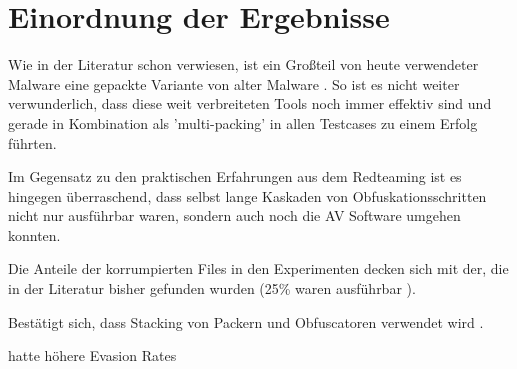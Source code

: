 \section{Einordnung der Ergebnisse}
Wie in der Literatur schon verwiesen, ist ein Großteil von heute verwendeter Malware eine gepackte Variante von alter Malware \cite{zhang_2019_a}. So ist es nicht weiter verwunderlich, dass diese weit verbreiteten Tools noch immer effektiv sind und gerade in Kombination als 'multi-packing' in allen Testcases zu einem Erfolg führten. 

Im Gegensatz zu den praktischen Erfahrungen 
 aus dem Redteaming ist es hingegen überraschend, dass selbst lange Kaskaden von Obfuskationsschritten nicht nur ausführbar waren, sondern auch noch die AV Software umgehen konnten. 

Die Anteile der korrumpierten Files in den Experimenten decken sich mit der, die in der Literatur bisher gefunden wurden (25\% waren ausführbar \cite{castro_2019_armed}).

Bestätigt sich, dass Stacking von Packern und Obfuscatoren verwendet wird \cite{nawaz_2022_on}.

\cite{wang_2022_a} hatte höhere Evasion Rates
